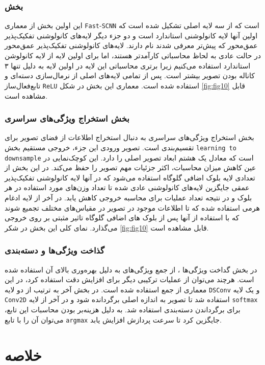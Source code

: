 \subsubsection{بخش }

این اولین بخش از معماری
\verb*|Fast|-\verb*|SCNN|
است که از سه لایه اصلی تشکیل شده است که اولین آنها لایه کانولوشنی استاندارد است و دو جزء دیگر لایه‌های کانولوشنی تفکیک‌پذیر عمق‌محور که پیش‌تر معرفی شدند نام دارند. لایه‌های کانولوشنی تفکیک‌پذیر عمق‌محور در حالت عادی به لحاظ محاسباتی کارآمدتر هستند، اما برای اولین لایه از لایه کانولوشن استاندارد استفاده می‌کنیم زیرا برتری محاسباتی این لایه در اولین لایه به دلیل تنها ۳ کاناله بودن تصویر بیشتر است. پس از تمامی لایه‌های اصلی از نرمال‌سازی دسته‌ای و تابع‌فعال‌ساز
\verb*|ReLU|
استفاده شده است. معماری این بخش در شکل
\ref{fig:fig10}
قابل مشاهده است.

\subsubsection{بخش استخراج ویژگی‌های سراسری}

بخش استخراج ویژگی‌های سراسری
به دنبال استخراج اطلاعات از فضای تصویر برای تقسیم‌بندی است. تصویر ورودی این جزء، خروجی مستقیم بخش
\verb*|learning to downsample|
است که معادل یک هشتم ابعاد تصویر اصلی را دارد. این کوچک‌نمایی در عین کاهش میزان محاسبات، اکثر جزئیات مهم تصویر را حفظ می‌کند. در این بخش از تعدادی لایه بلوک اضافی گلوگاه
استفاده می‌شود که در آنها لایه کانولوشنی تفکیک‌پذیر عمقی جایگزین لایه‌های کانولوشنی عادی شده تا تعداد وزن‌های مورد استفاده در هر بلوک و در نتیجه تعداد عملیات برای محاسبه خروجی کاهش یابد. در آخر از لایه ادغام هرمی
\cite{zhao2017pyramid}
استفاده شده که تا اطلاعات موجود در تصویر در مقیاس‌های مختلف تجمیع شوند که با استفاده از آنها پس از بلوک های اضافی گلوگاه تاثیر مثبتی بر روی خروجی می‌گذارد. نمای کلی این بخش در شکر 
\ref{fig:fig10}
قابل مشاهده است.

\subsubsection{گذاخت ویژگی‌ها و دسته‌بندی}

در بخش گداخت ویژگی‌ها
، از جمع ویژگی‌های به دلیل بهره‌وری بالای آن استفاده شده است. هرچند می‌توان از عملیات ترکیبی دیگر برای افزایش دقت استفاده کرد، در این معماری از جمع استفاده شده است. در بخش آخر به ترتیب از دو لایه
\verb*|DSConv|
و یک لایه
\verb*|Conv2D|
استفاده شد تا تصویر به اندازه اصلی برگردانده شود و در آخر از لایه
\verb*|softmax|
برای برگرداندن دسته‌بندی استفاده شد. به دلیل هزینه‌بر بودن محاسبات این تابع، می‌توان آن را با تابع
\verb*|argmax|
جایگزین کرد تا سرعت پردازش افزایش یابد.

\section{خلاصه}



